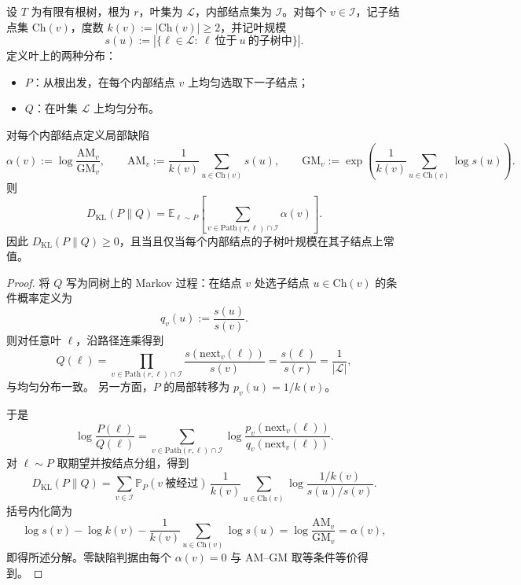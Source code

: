 \begin{theorem}[层级外置的树形 KL 分解]\label{thm:pom-tree-kl-amgm-decomposition}
设 \(T\) 为有限有根树，根为 \(r\)，叶集为 \(\mathcal L\)，内部结点集为 \(\mathcal I\)。对每个 \(v\in\mathcal I\)，记子结点集 \(\mathrm{Ch}(v)\)，度数 \(k(v):=\lvert\mathrm{Ch}(v)\rvert\ge 2\)，并记叶规模
\[
s(u):=\left|\{\ell\in\mathcal L:\ \ell\ \text{位于}\ u\ \text{的子树中}\}\right|.
\]
定义叶上的两种分布：
\begin{itemize}
  \item \(P\)：从根出发，在每个内部结点 \(v\) 上均匀选取下一子结点；
  \item \(Q\)：在叶集 \(\mathcal L\) 上均匀分布。
\end{itemize}
对每个内部结点定义局部缺陷
\[
\alpha(v):=\log\frac{\mathrm{AM}_v}{\mathrm{GM}_v},
\qquad
\mathrm{AM}_v:=\frac1{k(v)}\sum_{u\in\mathrm{Ch}(v)}s(u),
\qquad
\mathrm{GM}_v:=\exp\!\left(\frac1{k(v)}\sum_{u\in\mathrm{Ch}(v)}\log s(u)\right).
\]
则
\[
\boxed{\;
D_{\mathrm{KL}}(P\|Q)
=\mathbb E_{\ell\sim P}\!\left[
\sum_{v\in \mathrm{Path}(r,\ell)\cap\mathcal I}\alpha(v)\right].
\;}
\]
因此 \(D_{\mathrm{KL}}(P\|Q)\ge 0\)，且当且仅当每个内部结点的子树叶规模在其子结点上常值。
\end{theorem}
\begin{proof}
将 \(Q\) 写为同树上的 Markov 过程：在结点 \(v\) 处选子结点 \(u\in\mathrm{Ch}(v)\) 的条件概率定义为
\[
q_v(u):=\frac{s(u)}{s(v)}.
\]
则对任意叶 \(\ell\)，沿路径连乘得到
\[
Q(\ell)=\prod_{v\in\mathrm{Path}(r,\ell)\cap\mathcal I}\frac{s(\mathrm{next}_v(\ell))}{s(v)}
=\frac{s(\ell)}{s(r)}=\frac1{|\mathcal L|},
\]
与均匀分布一致。
另一方面，\(P\) 的局部转移为 \(p_v(u)=1/k(v)\)。

于是
\[
\log\frac{P(\ell)}{Q(\ell)}
=\sum_{v\in\mathrm{Path}(r,\ell)\cap\mathcal I}
\log\frac{p_v(\mathrm{next}_v(\ell))}{q_v(\mathrm{next}_v(\ell))}.
\]
对 \(\ell\sim P\) 取期望并按结点分组，得到
\[
D_{\mathrm{KL}}(P\|Q)
=\sum_{v\in\mathcal I}\mathbb P_P(v\ \text{被经过})\,
\frac1{k(v)}\sum_{u\in\mathrm{Ch}(v)}
\log\frac{1/k(v)}{s(u)/s(v)}.
\]
括号内化简为
\[
\log s(v)-\log k(v)-\frac1{k(v)}\sum_{u\in\mathrm{Ch}(v)}\log s(u)
=\log\frac{\mathrm{AM}_v}{\mathrm{GM}_v}
=\alpha(v),
\]
即得所述分解。零缺陷判据由每个 \(\alpha(v)=0\) 与 AM--GM 取等条件等价得到。
\end{proof}

